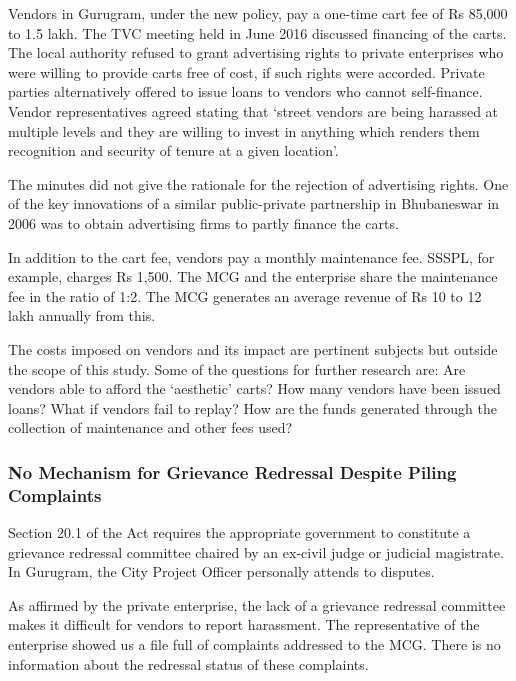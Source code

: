 \documentclass[a4paper, 12pt, twoside]{article}
\begin{document}
{{Vendors in Gurugram, under the new policy, pay a one-time cart fee of Rs 85,000 to 1.5 lakh. The TVC meeting held in June 2016 discussed financing of the carts. The local authority refused to grant advertising rights to private enterprises who were willing to provide carts free of cost, if such rights were accorded. Private parties alternatively offered to issue loans to vendors who cannot self-finance. Vendor representatives agreed stating that `street vendors are being harassed at multiple levels and they are willing to invest in anything which renders them recognition and security of tenure at a given location'.

The minutes did not give the rationale for the rejection of advertising rights. One of the key innovations of a similar public-private partnership in Bhubaneswar in 2006 was to obtain advertising firms to partly finance the carts.

In addition to the cart fee, vendors pay a monthly maintenance fee. SSSPL, for example, charges Rs 1,500. The MCG and the enterprise share the maintenance fee in the ratio of 1:2. The MCG generates an average revenue of Rs 10 to 12 lakh annually from this.

The costs imposed on vendors and its impact are pertinent subjects but outside the scope of this study. Some of the questions for further research are: Are vendors able to afford the `aesthetic' carts? How many vendors have been issued loans? What if vendors fail to replay? How are the funds generated through the collection of maintenance and other fees used?

\subsubsection*{No Mechanism for Grievance Redressal Despite Piling Complaints}

Section 20.1 of the Act requires the appropriate government to constitute a grievance redressal committee chaired by an ex-civil judge or judicial magistrate. In Gurugram, the City Project Officer personally attends to disputes.

As affirmed by the private enterprise, the lack of a grievance redressal committee makes it difficult for vendors to report harassment. The representative of the enterprise showed us a file full of complaints addressed to the MCG. There is no information about the redressal status of these complaints.

}}
\end{document}
